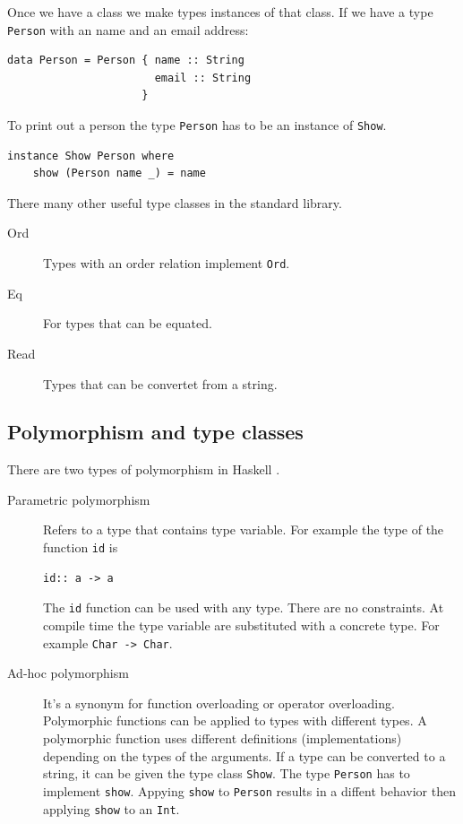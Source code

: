 \documentclass[twoside, a4paper]{article}
\begin{document}
Once we have a class we make types instances of that class. If we have a type \verb|Person| with an name and an email address:
\begin{verbatim}
data Person = Person { name :: String
                       email :: String
                     }
\end{verbatim}

To print out a person the type \verb|Person| has to be an instance of \verb|Show|.

\begin{verbatim}
instance Show Person where
    show (Person name _) = name
\end{verbatim}

There many other useful type classes in the standard library.

\begin{description}
\item[Ord] Types with an order relation implement \verb|Ord|.
\item[Eq] For types that can be equated.
\item[Read] Types that can be convertet from a string.
\end{description}

\subsection{Polymorphism and type classes}
\label{sec:polymorphism}

There are two types of polymorphism in Haskell \cite{Cardelli}.
\begin{description}
\item[Parametric polymorphism] Refers to a type that contains type variable. For example the type of the function \verb|id| is 
\begin{verbatim}
id:: a -> a
\end{verbatim}
The \verb|id| function can be used with any type. There are no constraints. At compile time the type variable are substituted with a concrete type. For example
\verb|Char -> Char|.
\item[Ad-hoc polymorphism] It's a synonym for function overloading or operator overloading. Polymorphic functions can be applied to types with different types. A polymorphic function uses different definitions (implementations) depending on the types of the arguments. If a type can be converted to a string, it can be given the type class \verb|Show|. The type \verb|Person| has to implement \verb|show|. Appying \verb|show| to \verb|Person| results in a diffent behavior then applying \verb|show| to an \verb|Int|.
\end{description}
\end{document}
